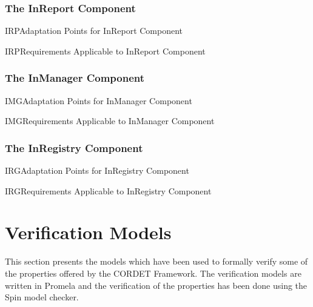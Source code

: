 \documentclass[a4paper,10pt]{article}
\let\stdsection\section
\renewcommand\section{\newpage\stdsection}
\newenvironment{cr_req}[2]
{%
\begin{longtable}{|l|p{9.8cm}|}
\caption{#2} \\
\hline
\rowcolor{light-gray}
\textbf{Req. ID} & \textbf{Requirement Text}\\
\hline\hline
\endfirsthead
\rowcolor{light-gray}
\textbf{Req. ID} & \textbf{Requirement Text}\\
\hline\hline
\endhead
\DTLforeach*[\DTLiseq{\cat}{#1}]{dbReq}{\cat=Category,\type=Type,\id=Id,\reqText=Text}
{\DTLiffirstrow{}{\\\hline}\cat-\id/\type & \textit{\reqText}}\\\hline
}
{\end{longtable}}
\newenvironment{cr_ap}[2]
{%
\begin{longtable}{|l|p{4.7cm}|p{4.9cm}|}
\caption{#2} \\
\hline
\rowcolor{light-gray}
\textbf{AP ID} & \textbf{Adaptation Point} & \textbf{Default Value}\\
\hline\hline
\endfirsthead
\rowcolor{light-gray}
\textbf{AP ID} & \textbf{Adaptation Point} & \textbf{Default Value}\\
\hline\hline
\endhead
\DTLforeach*[\DTLiseq{\cat}{#1}]{dbAP}{\cat=Category,\id=Id,\ap=AP,\defValue=DefValue}
{\DTLiffirstrow{}{\\\hline}\cat-\id & \ap & \defValue}\\\hline
}
{\end{longtable}}
\begin{document}
\subsubsection{The InReport Component}\label{sec:InReport}


\begin{cr_ap}{IRP}{Adaptation Points for InReport Component}
\end{cr_ap}

\begin{cr_req}{IRP}{Requirements Applicable to InReport Component}
\end{cr_req}

\subsubsection{The InManager Component}\label{sec:InManager}


\begin{cr_ap}{IMG}{Adaptation Points for InManager Component}
\end{cr_ap}

\begin{cr_req}{IMG}{Requirements Applicable to InManager Component}
\end{cr_req}

\subsubsection{The InRegistry Component}\label{sec:InRegistry}


\begin{cr_ap}{IRG}{Adaptation Points for InRegistry Component}
\end{cr_ap}

\begin{cr_req}{IRG}{Requirements Applicable to InRegistry Component}
\end{cr_req}


\appendix
\section{Verification Models}\label{sec:VerModels}
This section presents the models which have been used to formally verify some of the properties offered by the CORDET Framework. The verification models are written in Promela and the verification of the properties has been done using the Spin model checker.
\end{document}
